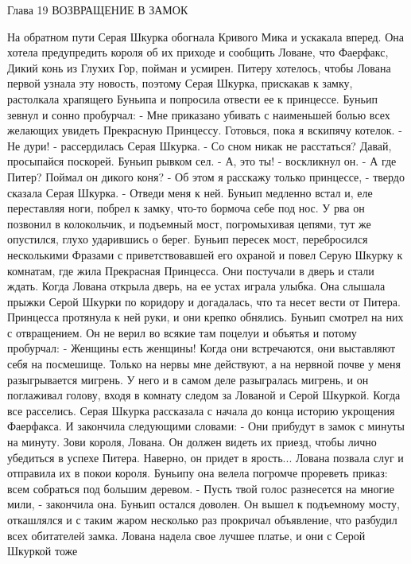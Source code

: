 Глава 19
        ВОЗВРАЩЕНИЕ В ЗАМОК

    На обратном пути Серая Шкурка обогнала Кривого Мика и ускакала 
вперед. Она хотела предупредить короля об их приходе и сообщить 
Ловане, что Фаерфакс, Дикий конь из Глухих Гор, пойман и усмирен. 
Питеру хотелось, чтобы Лована первой узнала эту новость, поэтому Серая 
Шкурка, прискакав к замку, растолкала храпящего Буньипа и попросила 
отвести ее к принцессе.
    Буньип зевнул и сонно пробурчал:
    - Мне приказано убивать с наименьшей болью всех желающих увидеть 
Прекрасную Принцессу. Готовься, пока я вскипячу котелок.
    - Не дури! - рассердилась Серая Шкурка. - Со сном никак не 
расстаться? Давай, просыпайся поскорей.
    Буньип рывком сел.
    - А, это ты! - воскликнул он. - А где Питер? Поймал он дикого 
коня?
    - Об этом я расскажу только принцессе, - твердо сказала Серая 
Шкурка. - Отведи меня к ней.
    Буньип медленно встал и, еле переставляя ноги, побрел к замку, 
что-то бормоча себе под нос. У рва он позвонил в колокольчик, и 
подъемный мост, погромыхивая цепями, тут же опустился, глухо 
ударившись о берег.
    Буньип пересек мост, перебросился несколькими Фразами с 
приветствовавшей его охраной и повел Серую Шкурку к комнатам, где жила 
Прекрасная Принцесса. Они постучали в дверь и стали ждать.
    Когда Лована открыла дверь, на ее устах играла улыбка. Она слышала 
прыжки Серой Шкурки по коридору и догадалась, что та несет вести от 
Питера. Принцесса протянула к ней руки, и они крепко обнялись.
    Буньип смотрел на них с отвращением. Он не верил во всякие там 
поцелуи и объятья и потому пробурчал:
    - Женщины есть женщины! Когда они встречаются, они выставляют себя 
на посмешище. Только на нервы мне действуют, а на нервной почве у меня 
разыгрывается мигрень.
    У него и в самом деле разыгралась мигрень, и он поглаживал голову, 
входя в комнату следом за Лованой и Серой Шкуркой.
    Когда все расселись. Серая Шкурка рассказала с начала до конца 
историю укрощения Фаерфакса. И закончила следующими словами:
    - Они прибудут в замок с минуты на минуту. Зови короля, Лована. Он 
должен видеть их приезд, чтобы лично убедиться в успехе Питера. 
Наверно, он придет в ярость...
    Лована позвала слуг и отправила их в покои короля. Буньипу она 
велела погромче прореветь приказ: всем собраться под большим деревом.
    - Пусть твой голос разнесется на многие мили, - закончила она.
    Буньип остался доволен. Он вышел к подъемному мосту, откашлялся и 
с таким жаром несколько раз прокричал объявление, что разбудил всех 
обитателей замка.
    Лована надела свое лучшее платье, и они с Серой Шкуркой тоже 
